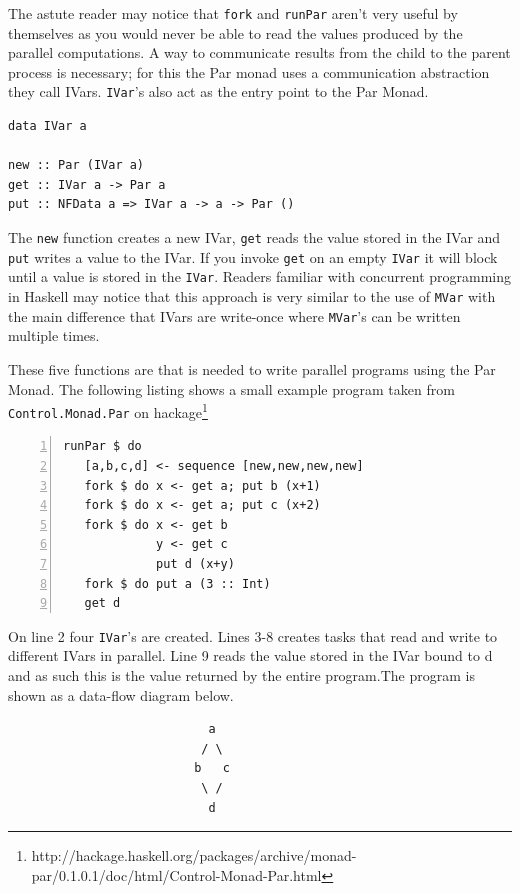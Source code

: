 \documentclass[a4paper, oneside, final]{article}
\begin{document}
The astute reader may notice that \texttt{fork} and \texttt{runPar} aren't very useful by themselves as you would never be able to read the values produced by the parallel computations. A way to communicate results from the child to the parent process is necessary; for this the Par monad uses a communication abstraction they call IVars. \texttt{IVar}'s also act as the entry point to the Par Monad. \newline

\begin{lstlisting}
data IVar a 

new :: Par (IVar a)
get :: IVar a -> Par a
put :: NFData a => IVar a -> a -> Par ()
\end{lstlisting}

The \texttt{new} function creates a new IVar, \texttt{get} reads the
value stored in the IVar and \texttt{put} writes a value to the IVar.
If you invoke \texttt{get} on an empty \texttt{IVar} it will block
until a value is stored in the \texttt{IVar}. Readers familiar with
concurrent programming in Haskell may notice that this approach is
very similar to the use of \texttt{MVar} with the main difference that
IVars are write-once where \texttt{MVar}'s can be written multiple
times.

These five functions are that is needed to write parallel programs
using the Par Monad. The following listing shows a small example
program taken from \texttt{Control.Monad.Par} on
hackage\footnote{http://hackage.haskell.org/packages/archive/monad-
par/0.1.0.1/doc/html/Control-Monad-Par.html} \newline

\begin{lstlisting}[numbers=left, numberstyle=\tiny]
runPar $ do
   [a,b,c,d] <- sequence [new,new,new,new]
   fork $ do x <- get a; put b (x+1)
   fork $ do x <- get a; put c (x+2)
   fork $ do x <- get b
             y <- get c 
             put d (x+y)
   fork $ do put a (3 :: Int)
   get d
\end{lstlisting}

On line 2 four \texttt{IVar}'s are created. Lines 3-8 creates tasks
that read and write to different IVars in parallel. Line 9 reads the
value stored in the IVar bound to d and as such this is the value
returned by the entire program.The program is shown as a data-flow
diagram below. \newline

\begin{lstlisting}
                            a
                           / \  
                          b   c
                           \ /
                            d
\end{lstlisting}
\end{document}

